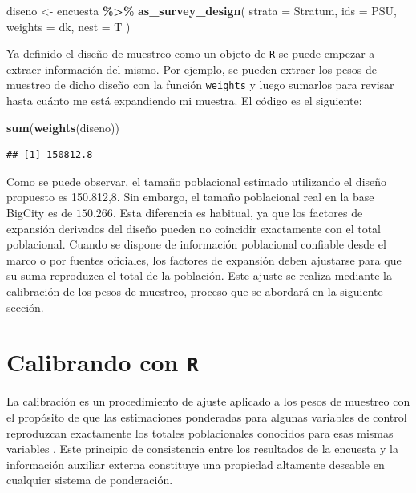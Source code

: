 \documentclass[
  spanish,
  12pt,
]{book}
\newenvironment{Shaded}{\begin{snugshade}}{\end{snugshade}}
\newcommand{\AttributeTok}[1]{\textcolor[rgb]{0.13,0.29,0.53}{#1}}
\newcommand{\FunctionTok}[1]{\textcolor[rgb]{0.13,0.29,0.53}{\textbf{#1}}}
\newcommand{\NormalTok}[1]{#1}
\newcommand{\OtherTok}[1]{\textcolor[rgb]{0.56,0.35,0.01}{#1}}
\newcommand{\SpecialCharTok}[1]{\textcolor[rgb]{0.81,0.36,0.00}{\textbf{#1}}}
\begin{document}
\begin{Shaded}
\begin{Highlighting}[]
\NormalTok{diseno }\OtherTok{\textless{}{-}}\NormalTok{ encuesta }\SpecialCharTok{\%\textgreater{}\%}
  \FunctionTok{as\_survey\_design}\NormalTok{(}
    \AttributeTok{strata =}\NormalTok{ Stratum,}
    \AttributeTok{ids =}\NormalTok{ PSU,}
    \AttributeTok{weights =}\NormalTok{ dk,}
    \AttributeTok{nest =}\NormalTok{ T}
\NormalTok{  )}
\end{Highlighting}
\end{Shaded}

Ya definido el diseño de muestreo como un objeto de \texttt{R} se puede empezar a extraer información del mismo. Por ejemplo, se pueden extraer los pesos de muestreo de dicho diseño con la función \texttt{weights} y luego sumarlos para revisar hasta cuánto me está expandiendo mi muestra. El código es el siguiente:

\begin{Shaded}
\begin{Highlighting}[]
\FunctionTok{sum}\NormalTok{(}\FunctionTok{weights}\NormalTok{(diseno))}
\end{Highlighting}
\end{Shaded}

\begin{verbatim}
## [1] 150812.8
\end{verbatim}

Como se puede observar, el tamaño poblacional estimado utilizando el diseño propuesto es 150.812,8. Sin embargo, el tamaño poblacional real en la base BigCity es de \(150.266\). Esta diferencia es habitual, ya que los factores de expansión derivados del diseño pueden no coincidir exactamente con el total poblacional. Cuando se dispone de información poblacional confiable desde el marco o por fuentes oficiales, los factores de expansión deben ajustarse para que su suma reproduzca el total de la población. Este ajuste se realiza mediante la calibración de los pesos de muestreo, proceso que se abordará en la siguiente sección.

\section{\texorpdfstring{Calibrando con \texttt{R}}{Calibrando con R}}\label{calibrando-con-r}

La calibración es un procedimiento de ajuste aplicado a los pesos de muestreo con el propósito de que las estimaciones ponderadas para algunas variables de control reproduzcan exactamente los totales poblacionales conocidos para esas mismas variables \citep{sarndal2003model}. Este principio de consistencia entre los resultados de la encuesta y la información auxiliar externa constituye una propiedad altamente deseable en cualquier sistema de ponderación.
\end{document}
